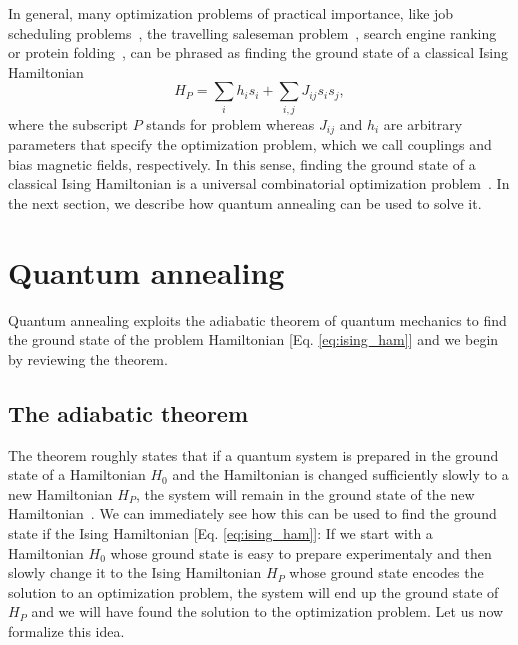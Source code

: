 \documentclass[12pt,a4paper]{article}
\begin{document}
\hspace*{0.3cm}
In general, many optimization problems of practical importance, like job scheduling problems~\cite{venturelli2015quantum},
the travelling saleseman problem~\cite{martovnak2004quantum}, search engine ranking~\cite{garnerone2012adiabatic}
or protein folding~\cite{perdomo2012finding}, can be phrased as finding the ground state of a
classical Ising Hamiltonian
\begin{equation}
    H_P = \sum_i h_i s_i + \sum_{i,j} J_{ij} s_i s_j,
    \label{eq:ising_ham}
\end{equation}
where the subscript $P$ stands for problem whereas $J_{ij}$ and $h_i$ are arbitrary parameters that specify the optimization
problem, which we call couplings and bias magnetic fields, respectively. In this sense, finding the ground state
of a classical Ising Hamiltonian is a universal combinatorial optimization problem~\cite*{lucas2014ising}.
In the next section, we describe how quantum annealing can be used to solve it.



\section{Quantum annealing} \label{sec:qa}

\hspace*{0.3cm}
Quantum annealing exploits the adiabatic theorem of quantum mechanics
to find the ground state of the problem Hamiltonian [Eq. \eqref{eq:ising_ham}] and we begin
by reviewing the theorem. 

\subsection*{The adiabatic theorem} \label{sec:adiabatic}
\hspace*{0.3cm}
The theorem roughly states that if a quantum system is prepared in the ground state of a Hamiltonian $H_0$
and the Hamiltonian is changed sufficiently slowly to a new Hamiltonian $H_P$, the system will remain in the
ground state of the new Hamiltonian~\cite*{albash2018adiabatic}. We can immediately see how this can be used to find the ground state
if the Ising Hamiltonian [Eq. \eqref{eq:ising_ham}]: If we start with a Hamiltonian $H_0$ whose ground state is
easy to prepare experimentaly and then slowly change it to the Ising Hamiltonian $H_P$ whose ground state encodes the
solution to an optimization problem, the system will end up the ground state of $H_P$ and
we will have found the solution to the optimization problem. Let us now formalize this idea.
\end{document}
